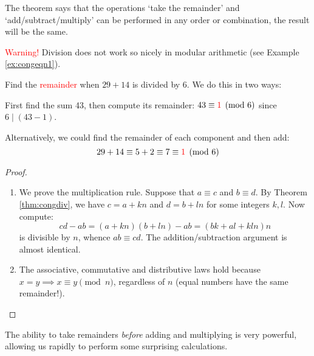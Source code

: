 The theorem says that the operations `take the remainder' and `add/subtract/multiply' can be performed in any order or combination, the result will be the same.\par
\textcolor{red}{Warning!} Division does not work so nicely in modular arithmetic (see Example \ref{ex:congeqn1}).

\begin{example}{}{}
	Find the \textcolor{red}{remainder} when $29+14$ is divided by 6. We do this in two ways:
	\begin{enumeratea}\itemsep0pt
		\item First find the sum 43, then compute its remainder: $43\equiv\textcolor{red}{1}\pmod 6$ since $6\mid(43-1)$.
		\item Alternatively, we could find the remainder of each component and then add:
		\[
			29+14\equiv 5+2\equiv 7\equiv \textcolor{red}{1}\pmod 6
		\]
	\end{enumeratea}
\end{example}

\goodbreak

\begin{proof}
	\begin{enumerate}
	  \item We prove the multiplication rule. Suppose that $a\equiv c$ and $b\equiv d$. By Theorem \ref{thm:congdiv}, we have $c=a+kn$ and $d=b+ln$ for some integers $k,l$. Now compute:
		\[
			cd-ab=(a+kn)(b+ln)-ab =(bk+al+kln)n
		\]
		is divisible by $n$, whence $ab\equiv cd$. The addition/subtraction argument is almost identical.
		\item The associative, commutative and distributive laws hold because $x=y\implies x\equiv y\pmod n$, regardless of $n$ (equal numbers have the same remainder!).\qedhere
	\end{enumerate}	  
\end{proof}

The ability to take remainders \emph{before} adding and multiplying is very powerful, allowing us rapidly to perform some surprising calculations.

